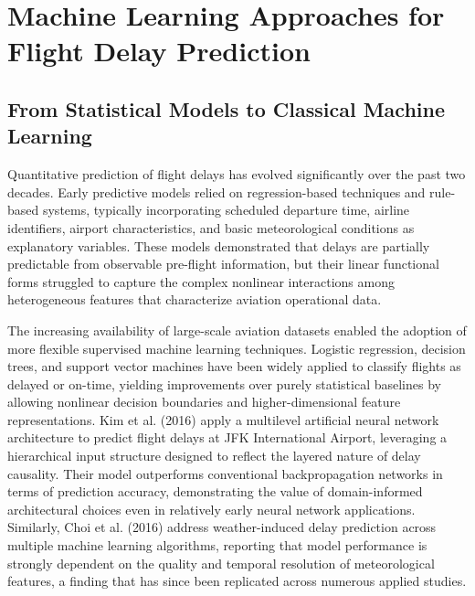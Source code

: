 \documentclass{report}
\begin{document}
\section{Machine Learning Approaches for Flight Delay Prediction}

\subsection{From Statistical Models to Classical Machine Learning}

Quantitative prediction of flight delays has evolved significantly over the past two decades. Early predictive models relied on regression-based techniques and rule-based systems, typically incorporating scheduled departure time, airline identifiers, airport characteristics, and basic meteorological conditions as explanatory variables. These models demonstrated that delays are partially predictable from observable pre-flight information, but their linear functional forms struggled to capture the complex nonlinear interactions among heterogeneous features that characterize aviation operational data.

The increasing availability of large-scale aviation datasets enabled the adoption of more flexible supervised machine learning techniques. Logistic regression, decision trees, and support vector machines have been widely applied to classify flights as delayed or on-time, yielding improvements over purely statistical baselines by allowing nonlinear decision boundaries and higher-dimensional feature representations. Kim et al. (2016) apply a multilevel artificial neural network architecture to predict flight delays at JFK International Airport, leveraging a hierarchical input structure designed to reflect the layered nature of delay causality. Their model outperforms conventional backpropagation networks in terms of prediction accuracy, demonstrating the value of domain-informed architectural choices even in relatively early neural network applications. Similarly, Choi et al. (2016) address weather-induced delay prediction across multiple machine learning algorithms, reporting that model performance is strongly dependent on the quality and temporal resolution of meteorological features, a finding that has since been replicated across numerous applied studies.
\end{document}
